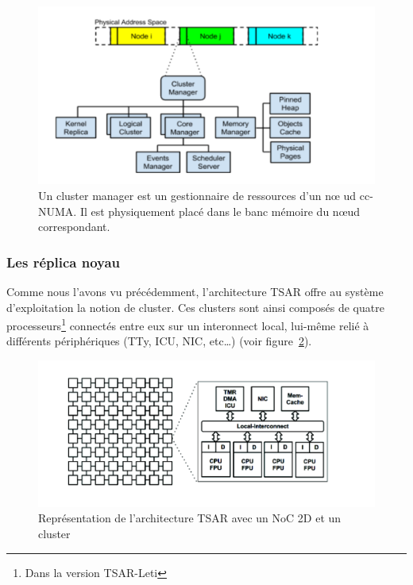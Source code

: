       \begin{figure}[!h]
        \centering
        \includegraphics[scale=0.16]{include/img/cluster_manager}
        \caption{Un cluster manager est un gestionnaire de ressources d'un n\oe
          ud cc-NUMA. Il est physiquement placé dans le banc mémoire du n\oe ud
          correspondant.}
        \label{fig:cluster_manager}
      \end{figure}

      
    \subsubsection{Les réplica noyau}

      Comme nous l'avons vu précédemment, l'architecture TSAR offre au système
      d'exploitation la notion de cluster. Ces clusters sont ainsi composés de
      quatre processeurs\footnote{Dans la version TSAR-Leti} connectés entre eux
      sur un interonnect local, lui-même relié à différents périphériques (TTy,
      ICU, NIC, etc\ldots) (voir figure~\ref{fig:tsar_cluster}).
      
      \begin{figure}[!h]
        \centering
        \includegraphics[scale=0.17]{include/img/tsar_clusters.png}
        \caption{Représentation de l'architecture TSAR avec un NoC 2D et un
          cluster~\cite{almaless2014universite}}
        \label{fig:tsar_cluster}

      \end{figure}

